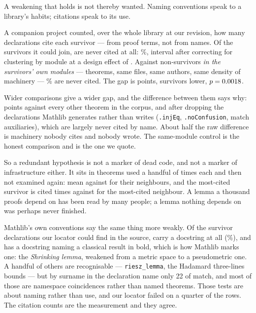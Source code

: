 \documentclass[11pt]{article}
\begin{document}
A weakening that holds is not thereby wanted. Naming conventions speak to a
library's habits; citations speak to its use.

A companion project counted, over the whole library at our revision, how many
declarations cite each survivor --- from proof terms, not from names. Of the
\citedN{} survivors it could join, \citedNever{} are never cited at all:
\citedNeverPercent{}\%, interval \citedNeverCI{} after correcting for clustering
by module at a design effect of \citedDeff{}. Against non-survivors \emph{in the
survivors' own modules} --- \citedControlN{} theorems, same files, same authors,
same density of machinery --- \citedControlPercent{}\% are never cited. The gap
is \citedGap{} points, survivors lower, $p = 0.0018{}$.

Wider comparisons give a wider gap, and the difference between them says why:
\citedGapAll{} points against every other theorem in the corpus, and
\citedGapClean{} after dropping the \citedGenerated{} declarations Mathlib
generates rather than writes (\texttt{.injEq}, \texttt{.noConfusion}, match
auxiliaries), which are largely never cited by name. About half the raw
difference is machinery nobody cites and nobody wrote. The same-module control
is the honest comparison and is the one we quote.

So a redundant hypothesis is not a marker of dead code, and not a marker of
infrastructure either. It sits in theorems used a handful of times each and then
not examined again: mean \citedMean{} against \citedControlMean{} for their
neighbours, and the most-cited survivor is cited \citedMax{} times against
\citedControlMax{} for the most-cited neighbour. A lemma a thousand proofs
depend on has been read by many people; a lemma nothing depends on was perhaps
never finished.

Mathlib's own conventions say the same thing more weakly. Of the
\namedLocated{} survivor declarations our locator could find in the source,
\namedDocumented{} carry a docstring at all (\namedDocumentedPercent{}\%), and
\namedClassical{} has a docstring naming a classical result in bold, which is
how Mathlib marks one: the \emph{Shrinking lemma}, weakened from a metric space
to a pseudometric one. A handful of others are recognisable ---
\texttt{riesz\_lemma}, the Hadamard three-lines bounds --- but by surname in the
declaration name only 22 of \allSurvivors{} match, and most of those are
namespace coincidences rather than named theorems. Those tests are about naming
rather than use, and our locator failed on a quarter of the rows. The citation
counts are the measurement and they agree.
\end{document}
